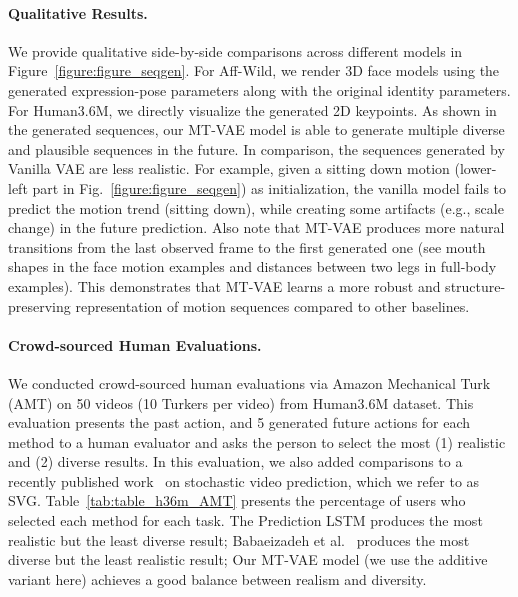 \documentclass[runningheads]{llncs}
\begin{document}
\paragraph{Qualitative Results.}
\vspace*{-0.1in}
We provide qualitative side-by-side comparisons across different models in Figure~\ref{figure:figure_seqgen}.
For Aff-Wild, we render 3D face models using the generated expression-pose parameters along with the original identity parameters.
For Human3.6M, we directly visualize the generated 2D keypoints.
As shown in the generated sequences, our MT-VAE model is able to generate multiple diverse and plausible sequences in the future.
In comparison, the sequences generated by Vanilla VAE are less realistic.
For example, given a sitting down motion (lower-left part in Fig.~\ref{figure:figure_seqgen}) as initialization, the vanilla model fails to predict the motion trend (sitting down), while creating some artifacts (e.g., scale change) in the future prediction.
Also note that MT-VAE produces more natural transitions from the last observed frame to the first generated one (see mouth shapes in the face motion examples and distances between two legs in full-body examples).
This demonstrates that MT-VAE learns a more robust and structure-preserving representation of motion sequences compared to other baselines.


\paragraph{Crowd-sourced Human Evaluations.}

We conducted crowd-sourced human evaluations via Amazon Mechanical Turk (AMT) on 50 videos (10 Turkers per video) from Human3.6M dataset.
This evaluation presents the past action, and 5 generated future actions for each method to a human evaluator and asks the person to select the most (1) realistic and (2) diverse results.
In this evaluation, we also added comparisons to a recently published work~\cite{denton2018stochastic} on stochastic video prediction, which we refer to as SVG.
Table~\ref{tab:table_h36m_AMT} presents the percentage of users who selected each method for each task. 
The Prediction LSTM produces the most realistic but the least diverse result;
Babaeizadeh et al.~\cite{mohammad2018stochastic} produces the most diverse but the least realistic result; Our MT-VAE model (we use the additive variant here) achieves a good balance between 
realism and diversity.
\end{document}
